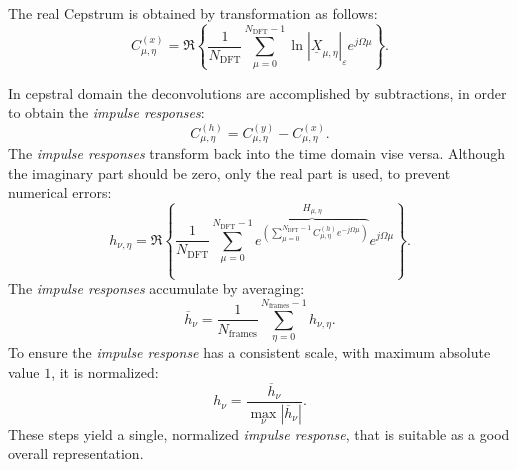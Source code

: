 \documentclass{article}
\begin{document}
The real Cepstrum is obtained by transformation as follows: 
\begin{equation}
  C^{(x)}_{\mu,\eta} = \Re\left\{ \frac{1}{N_{\text{DFT}}}  \sum_{\mu=0}^{N_{\text{DFT}}-1} \ln|\underline{X}_{\mu, \eta}|_{\varepsilon} e^{j\Omega \mu} \right\}.
\end{equation}

%
%
%
%



In cepstral domain the deconvolutions are accomplished by subtractions, in order to obtain the \textit{impulse responses}:
\begin{equation}
  C^{(h)}_{\mu,\eta} =  C^{(y)}_{\mu,\eta} -  C^{(x)}_{\mu,\eta}.
\end{equation}
The \textit{impulse responses} transform back into the time domain vise versa. Although the imaginary part should be zero, only the real part is used, to prevent numerical errors:
\begin{equation}
h_{\nu,\eta} = \Re\left\{ \frac{1}{N_{\text{DFT}}} \sum_{\mu=0}^{N_{\text{DFT}}-1}  \overbrace{e^{\left(   \sum_{\mu=0}^{N_{\text{DFT}}-1}C^{(h)}_{\mu, \eta}  e^{-j\Omega \mu}    \right)}}^{H_{\mu, \eta}}   e^{j\Omega \mu} \right\}.
\end{equation}
The \textit{impulse responses} accumulate by averaging:
\begin{equation}
\overline{h}_{\nu}=\frac{1}{N_{\text{frames}}} \sum_{\eta=0}^{N_{\text{frames}}-1} h_{\nu,\eta}.
\end{equation}
To ensure the \textit{impulse response} has a consistent scale, with maximum absolute value $1$, it is normalized:
\begin{equation}
   h_{\nu} = \frac{\overline{h}_{\nu}}{\max_{\nu} |\overline{h}_{\nu}|}. \label{eq:IR}
\end{equation}
These steps yield a single, normalized \textit{impulse response}, that is suitable as a good overall representation.
\end{document}

